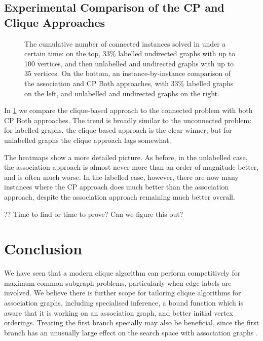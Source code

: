\documentclass{llncs}
\begin{document}
\subsection{Experimental Comparison of the CP and Clique Approaches}\label{mccs-eval}

\begin{figure}[tb]
    \centering
    
    \vspace*{1em}

    \centering
    
    \caption{The cumulative number of connected instances solved in under a certain time: on the
        top, 33\% labelled undirected graphs with up to 100 vertices, and then unlabelled
        and undirected graphs with up to 35 vertices. On the bottom, an instance-by-instance
        comparison of the association and CP Both approaches, with 33\% labelled graphs on the
        left, and unlabelled and undirected graphs on the right.} \label{figure:connected-cumulative}
\end{figure}

In \cref{figure:connected-cumulative} we compare the clique-based approach to the connected problem
with both CP Both approaches. The trend is broadly similar to the unconnected problem: for labelled
graphs, the clique-based approach is the clear winner, but for unlabelled graphs the clique approach
lags somewhat.

The heatmaps show a more detailed picture. As before, in the unlabelled case, the association
approach is almost never more than an order of magnitude better, and is often much worse. In the
labelled case, however, there are now many instances where the CP approach does much better than the
association approach, despite the association approach remaining much better overall.

?? Time to find or time to prove? Can we figure this out?

\section{Conclusion}

We have seen that a modern clique algorithm can perform competitively for maximum common subgraph
problems, particularly when edge labels are involved.  We believe there is further scope for
tailoring clique algorithms for association graphs, including specialised inference, a bound
function which is aware that it is working on an association graph, and better initial vertex
orderings. Treating the first branch specially may also be beneficial, since the first branch has an
unusually large effect on the search space with association graphs
\cite{DBLP:conf/cocoon/SutersAZSSL05}.
\end{document}
